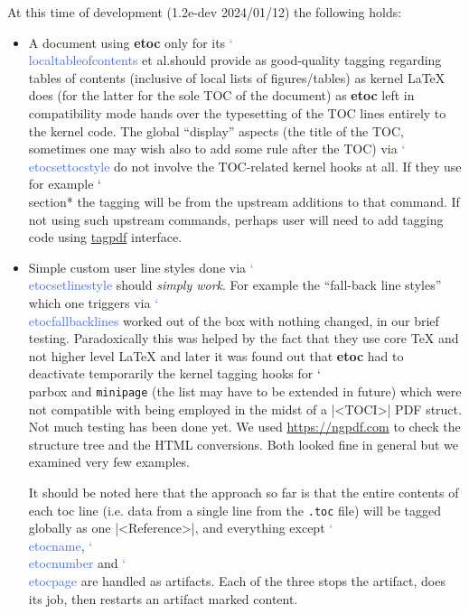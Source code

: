 \documentclass{article}
\DeclareRobustCommand\csa [1]
                {{\ttfamily\hyphenchar\font45 \char`\\ #1}}
\def\csb#1{\textcolor{RoyalBlue}{\csa{#1}}}
\newcommand\etoc{%
        \texorpdfstring{{\color{joli}\ttfamily\bfseries etoc}}{etoc}\xspace}
\newcommand\localtoc{\csb{localtableofcontents}\xspace}
\DeclareRobustCommand\ctanpkg[1]
      {\texorpdfstring{\href{https://ctan.org/pkg/#1}{#1}}{#1}}
\begin{document}
At this time of development (1.2e-dev 2024/01/12) the following holds:
\begin{itemize}
\item A document using \etoc only for its \localtoc et al.\@ should provide as
  good-quality tagging regarding tables of contents (inclusive of local lists
  of figures/tables) as kernel \LaTeX{} does (for the latter for the sole TOC
  of the document) as \etoc left in compatibility mode hands over the
  typesetting of the TOC lines entirely to the kernel code.  The global
  ``display'' aspects (the title of the TOC, sometimes one may wish also to
  add some rule after the TOC) via \csb{etocsettocstyle} do not involve the
  TOC-related kernel hooks at all.  If they use for example \csa{section*} the
  tagging will be from the upstream additions to that command.  If not using
  such upstream commands, perhaps user will need to add tagging code using
  \ctanpkg{tagpdf} interface.

\item Simple custom user line styles done via \csb{etocsetlinestyle} should
  \emph{simply work}.  For example the ``fall-back line styles'' which one
  triggers via \csb{etocfallbacklines} worked out of the box with nothing
  changed, in our brief testing.  Paradoxically this was helped by the fact
  that they use core \TeX{} and not higher level \LaTeX{} and later it was
  found out that \etoc had to deactivate temporarily the kernel tagging hooks
  for \csa{parbox} and \texttt{minipage} (the list may have to be extended in
  future) which were not compatible with being employed in the midst of a
  |<TOCI>| PDF struct.  Not much testing has been done yet.  We used
  \url{https://ngpdf.com} to check the structure tree and the HTML
  conversions. Both looked fine in general but we examined very few
  examples.

  It should be noted here that the approach so far is that the entire contents
  of each toc line (i.e. data from a single line from the \texttt{.toc} file)
  will be tagged globally as one |<Reference>|, and everything except
  \csb{etocname}, \csb{etocnumber} and \csb{etocpage} are handled as
  artifacts.  Each of the three stops the artifact, does its job, then
  restarts an artifact marked content.


\end{itemize}
\end{document}
